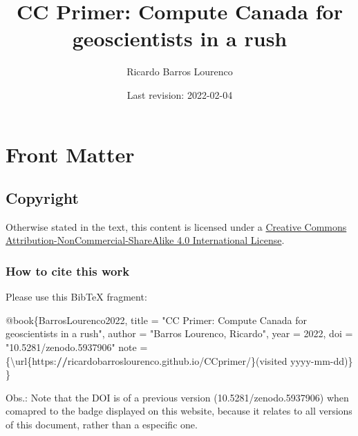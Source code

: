 \documentclass[
]{book}
\title{CC Primer: Compute Canada for geoscientists in a rush}
\author{Ricardo Barros Lourenco}
\date{Last revision: 2022-02-04}
\newenvironment{Shaded}{\begin{snugshade}}{\end{snugshade}}
\newcommand{\DecValTok}[1]{\textcolor[rgb]{0.00,0.00,0.81}{#1}}
\newcommand{\ErrorTok}[1]{\textcolor[rgb]{0.64,0.00,0.00}{\textbf{#1}}}
\newcommand{\NormalTok}[1]{#1}
\newcommand{\OtherTok}[1]{\textcolor[rgb]{0.56,0.35,0.01}{#1}}
\newcommand{\SpecialCharTok}[1]{\textcolor[rgb]{0.00,0.00,0.00}{#1}}
\newcommand{\StringTok}[1]{\textcolor[rgb]{0.31,0.60,0.02}{#1}}
\begin{document}
\maketitle

{
\setcounter{tocdepth}{1}
\tableofcontents
}
\hypertarget{front-matter}{%
\chapter{Front Matter}\label{front-matter}}

\hypertarget{copyright}{%
\section{Copyright}\label{copyright}}

Otherwise stated in the text, this content is licensed under a \href{http://creativecommons.org/licenses/by-nc-sa/4.0/}{Creative Commons Attribution-NonCommercial-ShareAlike 4.0 International License}.

\hypertarget{how-to-cite-this-work}{%
\subsection{How to cite this work}\label{how-to-cite-this-work}}

Please use this BibTeX fragment:

\begin{Shaded}
\begin{Highlighting}[]
\SpecialCharTok{@}\NormalTok{book\{BarrosLourenco2022,}
\NormalTok{  title     }\OtherTok{=} \StringTok{"CC Primer: Compute Canada for geoscientists in a rush"}\NormalTok{,}
\NormalTok{  author    }\OtherTok{=} \StringTok{"Barros Lourenco, Ricardo"}\NormalTok{,}
\NormalTok{  year      }\OtherTok{=} \DecValTok{2022}\NormalTok{,}
\NormalTok{  doi       }\OtherTok{=} \StringTok{"10.5281/zenodo.5937906"}
\NormalTok{  note      }\OtherTok{=}\NormalTok{ \{\textbackslash{}url\{https}\SpecialCharTok{:}\ErrorTok{//}\NormalTok{ricardobarroslourenco.github.io}\SpecialCharTok{/}\NormalTok{CCprimer}\SpecialCharTok{/}\NormalTok{\}(visited yyyy}\SpecialCharTok{{-}}\NormalTok{mm}\SpecialCharTok{{-}}\NormalTok{dd)\}}
\NormalTok{\}}
\end{Highlighting}
\end{Shaded}

Obs.: Note that the DOI is of a previous version (10.5281/zenodo.5937906) when
comapred to the badge displayed on this website, because it relates to all versions
of this document, rather than a especific one.
\end{document}
